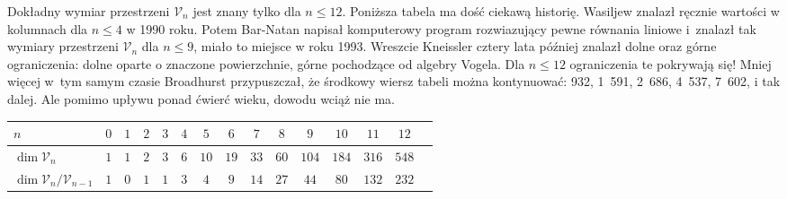 Dokładny wymiar przestrzeni $\mathcal V_n$ jest znany tylko dla $n \le 12$.
Poniższa tabela ma dość ciekawą historię.
Wasiljew znalazł ręcznie wartości w kolumnach dla $n \le 4$ w 1990 roku.
%
Potem Bar-Natan napisał komputerowy program rozwiazujący pewne równania liniowe i~znalazł tak wymiary przestrzeni $\mathcal V_n$ dla $n \le 9$, miało to miejsce w roku 1993.
%
Wreszcie Kneissler \cite{kneissler1997} cztery lata później znalazł dolne oraz górne ograniczenia: dolne oparte o znaczone powierzchnie, górne pochodzące od algebry Vogela.
%
%
Dla $n \le 12$ ograniczenia te pokrywają się!
Mniej więcej w~tym samym czasie Broadhurst \cite{broadhurst1997} przypuszczał, że środkowy wiersz tabeli można kontynuować: 932, 1~591, 2~686, 4~537, 7~602, i tak dalej.
Ale pomimo upływu ponad ćwierć wieku, dowodu wciąż nie ma.

{
\renewcommand*{\arraystretch}{1.4} %
\footnotesize
\begin{longtable}{lcccccccccccccc}
\hline
    $n$ & $0$ & $1$ & $2$ & $3$ & $4$ & $5$ & $6$ & $7$ & $8$ & $9$ & $10$ & $11$ & $12$ \\ \hline \endhead
    $\dim \mathcal V_n$ & $1$ & $1$ & $2$ & $3$ & $6$ & $10$ & $19$ & $33$ & $60$ & $104$ & $184$ & $316$ & $548$ \\
    $\dim \mathcal V_n / \mathcal V_{n-1}$ & $1$ & $0$ & $1$ & $1$ & $3$ & $4$ & $9$ & $14$ & $27$ & $44$ & $80$ & $132$ & $232$ \\
    \hline
\end{longtable}
\normalsize
}


